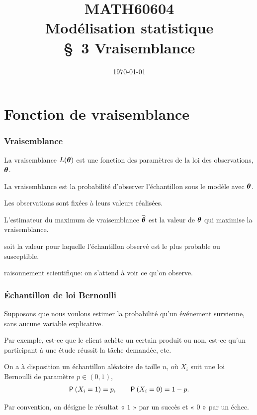 \documentclass{beamer}
\title[\color{white}{MATH60604 \S~3 Vraisemblance}]{MATH60604 \\Modélisation statistique \\ \S~3 Vraisemblance}
\author{}
\date{\today}
\institute{HEC Montréal\\
Département de sciences de la décision}
\date{}
\begin{document}
\frame{\titlepage}

\section{Fonction de vraisemblance}
\begin{frame}[fragile]
\frametitle{Vraisemblance}
\bi

\item La \alert{vraisemblance} $L(\bs{\theta})$ est une fonction des paramètres de la loi des observations, $\bs{\theta}$.
\bi \item La vraisemblance est la probabilité d'observer l'échantillon sous le modèle avec $\bs{\theta}$.
\item Les observations sont fixées à leurs valeurs réalisées.
\ei
\item L'estimateur du \alert{maximum de vraisemblance} $\hat{\bs{\theta}}$ est la valeur de $\bs{\theta}$ qui maximise la vraisemblance.
\bi \item soit la valeur pour laquelle l'échantillon observé est le plus probable ou susceptible.
\item raisonnement scientifique: on s'attend à voir ce qu'on observe.
\ei

\ei
\end{frame}
\begin{frame}[fragile]
\frametitle{Échantillon de loi Bernoulli}
\bi
\item  Supposons que nous voulons estimer la probabilité qu'un événement survienne, sans
aucune variable explicative.    
\item Par exemple, est-ce que le client achète un certain produit ou non, est-ce
qu'un participant à une étude réussit la tâche demandée, etc.

\item On a à disposition un échantillon aléatoire de taille $n$, où $X_i$ suit une loi Bernoulli de paramètre $p \in (0,1)$, 
\begin{align*}
\P{X_i=1}=p , \qquad \P{X_i=0}=1-p.
\end{align*}

\item Par convention, on désigne le résultat « $1$ » par un succès et « $0$ » par un échec.
\ei
\end{frame}
\end{document}
